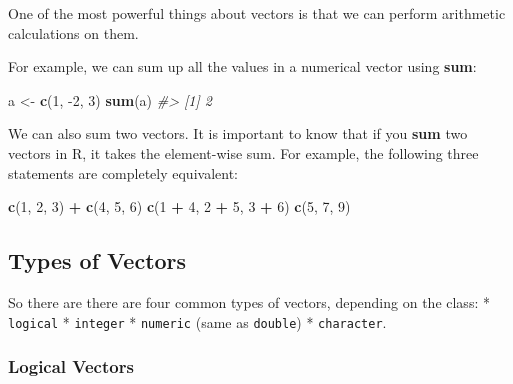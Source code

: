 \documentclass[]{book}
\newenvironment{Shaded}{\begin{snugshade}}{\end{snugshade}}
\newcommand{\CommentTok}[1]{\textcolor[rgb]{0.56,0.35,0.01}{\textit{#1}}}
\newcommand{\DecValTok}[1]{\textcolor[rgb]{0.00,0.00,0.81}{#1}}
\newcommand{\KeywordTok}[1]{\textcolor[rgb]{0.13,0.29,0.53}{\textbf{#1}}}
\newcommand{\NormalTok}[1]{#1}
\newcommand{\OperatorTok}[1]{\textcolor[rgb]{0.81,0.36,0.00}{\textbf{#1}}}
\newcommand{\StringTok}[1]{\textcolor[rgb]{0.31,0.60,0.02}{#1}}
\begin{document}
One of the most powerful things about vectors is that we can perform arithmetic calculations on them.

For example, we can sum up all the values in a numerical vector using \textbf{sum}:

\begin{Shaded}
\begin{Highlighting}[]
\NormalTok{a <-}\StringTok{ }\KeywordTok{c}\NormalTok{(}\DecValTok{1}\NormalTok{, }\DecValTok{-2}\NormalTok{, }\DecValTok{3}\NormalTok{)}
\KeywordTok{sum}\NormalTok{(a)}
\CommentTok{#> [1] 2}
\end{Highlighting}
\end{Shaded}

We can also sum two vectors. It is important to know that if you \textbf{sum} two vectors in R, it takes the element-wise sum. For example, the following three statements are completely equivalent:

\begin{Shaded}
\begin{Highlighting}[]
\KeywordTok{c}\NormalTok{(}\DecValTok{1}\NormalTok{, }\DecValTok{2}\NormalTok{, }\DecValTok{3}\NormalTok{) }\OperatorTok{+}\StringTok{ }\KeywordTok{c}\NormalTok{(}\DecValTok{4}\NormalTok{, }\DecValTok{5}\NormalTok{, }\DecValTok{6}\NormalTok{)}
\KeywordTok{c}\NormalTok{(}\DecValTok{1} \OperatorTok{+}\StringTok{ }\DecValTok{4}\NormalTok{, }\DecValTok{2} \OperatorTok{+}\StringTok{ }\DecValTok{5}\NormalTok{, }\DecValTok{3} \OperatorTok{+}\StringTok{ }\DecValTok{6}\NormalTok{)}
\KeywordTok{c}\NormalTok{(}\DecValTok{5}\NormalTok{, }\DecValTok{7}\NormalTok{, }\DecValTok{9}\NormalTok{)}
\end{Highlighting}
\end{Shaded}

\hypertarget{types-of-vectors}{%
\subsection{Types of Vectors}\label{types-of-vectors}}

So there are there are four common types of vectors, depending on the class:
* \texttt{logical}
* \texttt{integer}
* \texttt{numeric} (same as \texttt{double})
* \texttt{character}.

\hypertarget{logical-vectors}{%
\subsubsection*{Logical Vectors}\label{logical-vectors}}
\end{document}
